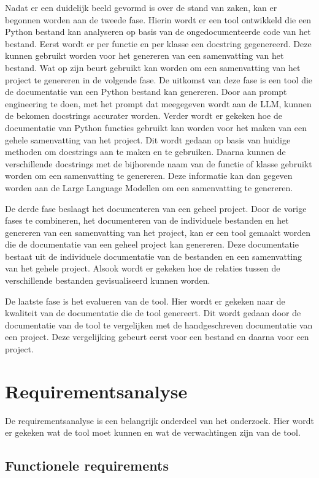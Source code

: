 Nadat er een duidelijk beeld gevormd is over de stand van zaken, kan er begonnen worden aan de tweede fase.
Hierin wordt er een tool ontwikkeld die een Python bestand kan analyseren op basis van de ongedocumenteerde code van het bestand.
Eerst wordt er per functie en per klasse een docstring gegenereerd. Deze kunnen gebruikt worden voor het genereren van een samenvatting van het bestand. 
Wat op zijn beurt gebruikt kan worden om een samenvatting van het project te genereren in de volgende fase.
De uitkomst van deze fase is een tool die de documentatie van een Python bestand kan genereren. 
Door aan prompt engineering te doen, met het prompt dat meegegeven wordt aan de LLM, kunnen de bekomen docstrings accurater worden.
Verder wordt er gekeken hoe de documentatie van Python functies gebruikt kan worden voor het maken van een gehele samenvatting van het project.
Dit wordt gedaan op basis van huidige methoden om docstrings aan te maken en te gebruiken. 
Daarna kunnen de verschillende docstrings met de bijhorende naam van de functie of klasse gebruikt worden om een samenvatting te genereren.
Deze informatie kan dan gegeven worden aan de Large Language Modellen om een samenvatting te genereren.

De derde fase beslaagt het documenteren van een geheel project.
Door de vorige fases te combineren, het documenteren van de individuele bestanden en het genereren van een samenvatting van het project, kan er een tool gemaakt worden die de documentatie van een geheel project kan genereren.
Deze documentatie bestaat uit de individuele documentatie van de bestanden en een samenvatting van het gehele project. 
Alsook wordt er gekeken hoe de relaties tussen de verschillende bestanden gevisualiseerd kunnen worden.

De laatste fase is het evalueren van de tool.
Hier wordt er gekeken naar de kwaliteit van de documentatie die de tool genereert.
Dit wordt gedaan door de documentatie van de tool te vergelijken met de handgeschreven documentatie van een project.
Deze vergelijking gebeurt eerst voor een bestand en daarna voor een project.

\section{Requirementsanalyse}
\label{sec:requirements-analyse}
De requirementsanalyse is een belangrijk onderdeel van het onderzoek. 
Hier wordt er gekeken wat de tool moet kunnen en wat de verwachtingen zijn van de tool.

\subsection{Functionele requirements}
\label{sec:functionele-requirements}

